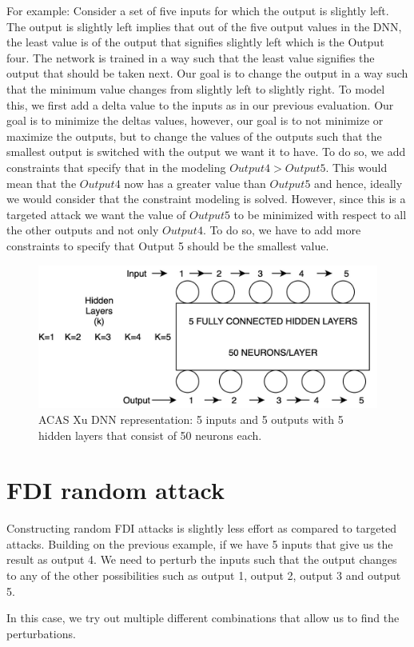 For example: Consider a set of five inputs for which the output is slightly left. The output is slightly left implies that out of the five output values in the DNN, the least value is of the output that signifies slightly left which is the Output four. The network is trained in a way such that the least value signifies the output that should be taken next. Our goal is to change the output in a way such that the minimum value changes from slightly left to slightly right. To model this, we first add a delta value to the inputs as in our previous evaluation. Our goal is to minimize the deltas values, however, our goal is to not minimize or maximize the outputs, but to change the values of the outputs such that the smallest output is switched with the output we want it to have. To do so, we add constraints that specify that in the modeling $Output 4 > Output 5$. This would mean that the $Output 4$ now has a greater value than $Output 5$ and hence, ideally we would consider that the constraint modeling is solved. However, since this is a targeted attack we want the value of $Output 5$ to be minimized with respect to all the other outputs and not only $Output 4$. To do so, we have to add more constraints to specify that Output 5 should be the smallest value.

\begin{figure}
	\centering
	\includegraphics[width=0.7\linewidth]{Images/ACASXuDNN}
	\caption[ACAS Xu DNN]{ACAS Xu DNN representation: 5 inputs and 5 outputs with 5 hidden layers that consist of 50 neurons each.}
	\label{fig:acasxudnn}
\end{figure}

\section{FDI random attack} 
Constructing random FDI attacks is slightly less effort  as compared to targeted attacks. 
Building on the previous example, if we have 5 inputs that give us the result as output 4. We need to perturb the inputs such that the output changes to any of the other possibilities such as output 1, output 2, output 3 and output 5.

In this case, we try out multiple different combinations that allow us to find the perturbations. 

